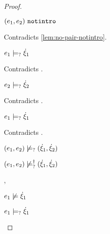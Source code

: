\begin{proof}
\begin{byCases}
\begin{byCases}
\begin{byCases}
\begin{byCases}
                \begin{pfsteps*}
                \item $(e_1 , e_2) ~\mathtt{notintro}$ 
                \end{pfsteps*}
                Contradicts \autoref{lem:no-pair-notintro}.
            \item[\text{(\ref{rule:CMSPair1})}]
                \begin{pfsteps*}
                \item $e_1 \models_{?} \dot{\xi}_1$ 
                \end{pfsteps*}
                Contradicts .
            \item[\text{(\ref{rule:CMSPair2})}]
                \begin{pfsteps*}
                \item $e_2 \models_{?} \dot{\xi}_2$ 
                \end{pfsteps*}
                Contradicts .
            \item[\text{(\ref{rule:CMSPair3})}]
                \begin{pfsteps*}
                \item $e_1 \models_{?} \dot{\xi}_1$ 
                \end{pfsteps*}
                Contradicts .
            \end{byCases}
            \begin{pfsteps*}
            \item $(e_1 , e_2) \not\models_{?} (\dot{\xi}_1 , \dot{\xi}_2)$  
            \item $(e_1 , e_2) \not\models_{?}^{\dag} (\dot{\xi}_1 , \dot{\xi}_2)$ 
            \end{pfsteps*}
        \item[\cmaysatisfy{e_1}{\hxi_1},\csatisfy{e_2}{\hxi_2}]
            \begin{pfsteps*}
            \item $e_1 \not\models \dot{\xi}_1$  
            \item $e_1 \models_{?} \dot{\xi}_1$  

\end{pfsteps*}
\end{byCases}
\end{byCases}
\end{byCases}
\end{proof}
